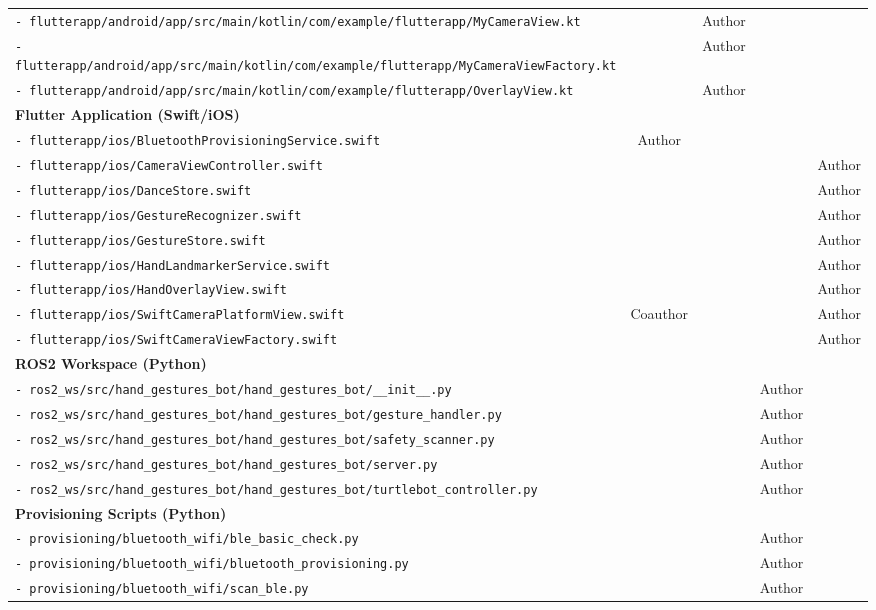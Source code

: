 \documentclass[11pt,a4paper]{article}
\begin{document}
\begin{longtable}{|p{}|c|c|c|c|}
\texttt{- flutterapp\slash android\slash app\slash src\slash main\slash kotlin\slash com\slash example\slash flutterapp\slash MyCameraView.kt} & & Author & & \\
\texttt{- flutterapp\slash android\slash app\slash src\slash main\slash kotlin\slash com\slash example\slash flutterapp\slash MyCameraViewFactory.kt} & & Author & & \\
\texttt{- flutterapp\slash android\slash app\slash src\slash main\slash kotlin\slash com\slash example\slash flutterapp\slash OverlayView.kt} & & Author & & \\
\hline
\multicolumn{5}{|l|}{\textbf{Flutter Application (Swift/iOS)}} \\
\hline
\texttt{- flutterapp\slash ios\slash BluetoothProvisioningService.swift} & Author & & & \\
\texttt{- flutterapp\slash ios\slash CameraViewController.swift} & & & & Author\\
\texttt{- flutterapp\slash ios\slash DanceStore.swift} & & & & Author \\
\texttt{- flutterapp\slash ios\slash GestureRecognizer.swift} & & & & Author \\
\texttt{- flutterapp\slash ios\slash GestureStore.swift} & & & & Author \\
\texttt{- flutterapp\slash ios\slash HandLandmarkerService.swift} & & & & Author \\
\texttt{- flutterapp\slash ios\slash HandOverlayView.swift} & & & & Author \\
\texttt{- flutterapp\slash ios\slash SwiftCameraPlatformView.swift} & Coauthor & & & Author \\
\texttt{- flutterapp\slash ios\slash SwiftCameraViewFactory.swift} & & & & Author \\
\hline
\multicolumn{5}{|l|}{\textbf{ROS2 Workspace (Python)}} \\
\hline
\texttt{- ros2\_ws\slash src\slash hand\_gestures\_bot\slash hand\_gestures\_bot\slash \_\_init\_\_.py} & & &Author & \\
\texttt{- ros2\_ws\slash src\slash hand\_gestures\_bot\slash hand\_gestures\_bot\slash gesture\_handler.py} & & &Author & \\
\texttt{- ros2\_ws\slash src\slash hand\_gestures\_bot\slash hand\_gestures\_bot\slash safety\_scanner.py} & & &Author & \\
\texttt{- ros2\_ws\slash src\slash hand\_gestures\_bot\slash hand\_gestures\_bot\slash server.py} & & &Author & \\
\texttt{- ros2\_ws\slash src\slash hand\_gestures\_bot\slash hand\_gestures\_bot\slash turtlebot\_controller.py} & & &Author & \\
\hline
\multicolumn{5}{|l|}{\textbf{Provisioning Scripts (Python)}} \\
\hline
\texttt{- provisioning\slash bluetooth\_wifi\slash ble\_basic\_check.py} & & &Author & \\
\texttt{- provisioning\slash bluetooth\_wifi\slash bluetooth\_provisioning.py} & & &Author & \\
\texttt{- provisioning\slash bluetooth\_wifi\slash scan\_ble.py} & & &Author & \\

\end{longtable}
\end{document}
